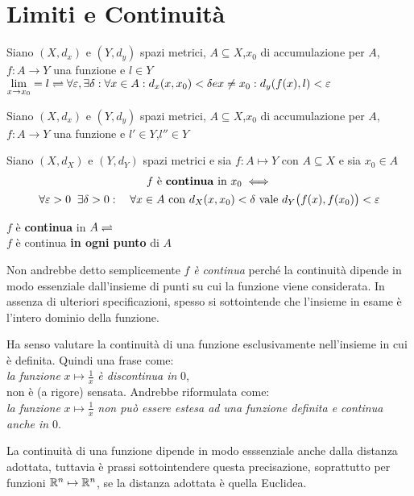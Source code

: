 \section{Limiti e Continuità}
\begin{definition}
	Siano $(X,d_x)$ e $(Y,d_y)$ spazi metrici, $A\subseteq{X}$,$x_0$ di accumulazione per $A$, $f:A\rightarrow{Y}$ una funzione e $l\in{Y}$ \\
	$\lim\limits_{x \rightarrow x_0} = l \rightleftharpoons \forall{\varepsilon},\exists\delta : \forall{x}\in A : d_x(x,x_0)<\delta e x\ne{x_0} : d_y(f(x),l)<\varepsilon$
\end{definition}

\begin{proposition}
	Siano $(X,d_x)$ e $(Y,d_y)$ spazi metrici, $A\subseteq{X}$,$x_0$ di accumulazione per $A$, $f:A\rightarrow{Y}$ una funzione e $l'\in{Y}$,$l''\in{Y}$
\end{proposition}

\begin{definition}
	\label{def:funz_cont}
	Siano $(X,d_X)$ e $(Y,d_Y)$ spazi metrici e sia $f: A \mapsto Y$ con $A \subseteq X$ e sia $x_0 \in A$
	\begin{equation*}
		\begin{gathered}
			f \text{ è \textbf{continua} in } x_0 \iff\\
			\forall \varepsilon > 0\;\;\exists \delta > 0:\quad \forall x \in A \text{ con } d_X(x,x_0)<\delta \text{ vale } d_Y \bigl(f(x),f(x_0)\bigr) < \varepsilon
		\end{gathered}
	\end{equation*}

	\begin{center}
		$f$ è \textbf{continua} in $A\rightleftharpoons$\\
		$f$ è continua \textbf{in ogni punto} di $A$
	\end{center}
	\begin{note}
		Non andrebbe detto semplicemente $f$ \textit{è continua} perché la continuità dipende in modo essenziale dall'insieme di punti su cui la funzione viene considerata. In assenza di ulteriori specificazioni, spesso si sottointende che l'insieme in esame è l'intero dominio della funzione.
	\end{note}
	\begin{note}
		Ha senso valutare la continuità di una funzione esclusivamente nell'insieme in cui è definita. Quindi una frase come:\\
		\textit{la funzione} $x \mapsto \frac{1}{x}$ \textit{è discontinua in} $0$,\\
		non è (a rigore) sensata. Andrebbe riformulata come:\\
		\textit{la funzione} $x \mapsto \frac{1}{x}$ \textit{non può essere estesa ad una funzione definita e continua anche in} $0$.
	\end{note}
	\begin{note}
		La continuità di una funzione dipende in modo esssenziale anche dalla distanza adottata, tuttavia è prassi sottointendere questa precisazione, soprattutto per funzioni $\mathbb{R}^n \mapsto \mathbb{R}^n$, se la distanza adottata è quella Euclidea.
	\end{note}
\end{definition}

